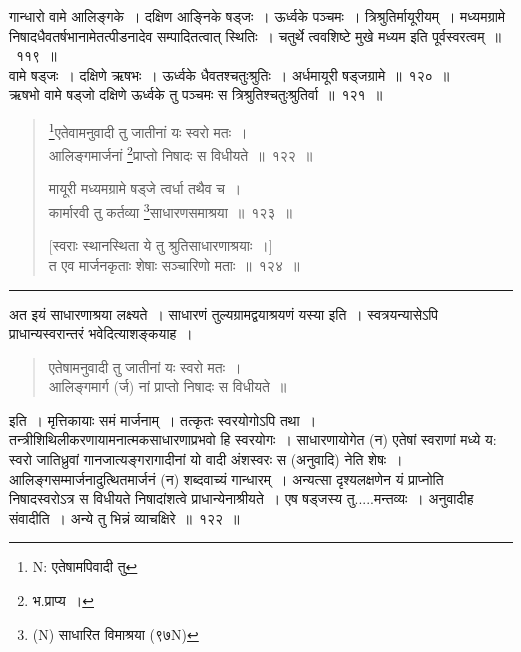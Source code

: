 \documentclass[11pt, openany]{book}
\begin{document}
गान्धारो वामे आलिङ्गके~। दक्षिण आङ्निके षड्जः~। ऊर्ध्वके पञ्चमः~। {\qtt त्रिश्रुतिर्मायूरीयम्}~। मध्यमग्रामे निषादधैवतर्षभानामेतत्पीडनादेव सम्पादितत्वात् स्थितिः~। चतुर्थे त्ववशिष्टे मुखे मध्यम इति पूर्वस्वरत्वम्~॥~११९~॥\\

वामे षड्जः~। दक्षिणे ऋषभः~। ऊर्ध्वके धैवतश्चतुःश्रुतिः~। अर्धमायूरी षड्जग्रामे~॥~१२०~॥\\

ऋषभो वामे षड्जो दक्षिणे ऊर्ध्वके तु पञ्चमः स त्रिश्रुतिश्चतुःश्रुतिर्वा~॥~१२१~॥

\newpage

\begin{quote}
{\na \renewcommand{\thefootnote}{1a}\footnote{N: एतेषामपिवादी तु}एतेवामनुवादी तु जातीनां यः स्वरो मतः~।\\
आलिङ्गमार्जनां \renewcommand{\thefootnote}{1}\footnote{भ.प्राप्य~।}प्राप्तो निषादः स विधीयते~॥~१२२~॥

मायूरी मध्यमग्रामे षड्जे त्वर्धा तथैव च~।\\
कार्मारवी तु कर्तव्या \renewcommand{\thefootnote}{2}\footnote{(N) साधारित विमाश्रया (९७N)}साधारणसमाश्रया~॥~१२३~॥

[स्वराः स्थानस्थिता ये तु श्रुतिसाधारणाश्रयाः~।]\\
त एव मार्जनकृताः शेषाः सञ्चारिणो मताः~॥~१२४~॥}
\end{quote}

\hrule

\vspace{2mm}
अत इयं साधारणाश्रया लक्ष्यते~। साधारणं तुल्यग्रामद्वयाश्रयणं यस्या इति~। स्वत्रयन्यासेऽपि प्राधान्यस्वरान्तरं भवेदित्याशङ्कयाह~।

\begin{quote}
{\qt एतेषामनुवादी तु जातीनां यः स्वरो मतः~।\\
 आलिङ्गमार्ग (र्ज) नां प्राप्तो निषादः स विधीयते~॥}
\end{quote}

\noindent
इति~। मृत्तिकायाः समं मार्जनाम्~। तत्कृतः स्वरयोगोऽपि तथा~। तन्त्रीशिथिलीकरणायामनात्मकसाधारणाप्रभवो हि स्वरयोगः~। साधारणायोगेत (न) एतेषां स्वराणां मध्ये य: स्वरो जातिध्रुवां गानजात्यङ्गरागादीनां यो वादी अंशस्वरः स (अनुवादि) नेति शेषः~। आलिङ्गसम्मार्जनादुत्थितमार्जनं (न) शब्दवाच्यं गान्धारम्~। अन्यत्सा दृश्यलक्षणेन यं प्राप्नोति निषादस्वरोऽत्र स विधीयते निषादांशत्वे प्राधान्येनाश्रीयते~। एष षड्जस्य तु.....मन्तव्यः~। अनुवादीह संवादीति~। अन्ये तु भिन्नं व्याचक्षिरे~॥~१२२~॥\\
\end{document}
